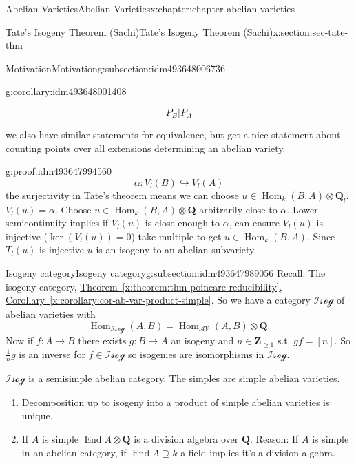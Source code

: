 \documentclass[oneside,10pt,]{book}
\numberwithin{equation}{section}
\newcommand{\lb}{[}
\newcommand{\rb}{]}
\newcommand{\ZZ}{\mathbf{Z}}
\newcommand{\QQ}{\mathbf{Q}}
\newcommand{\cat}[1]{\mathcal{#1}}
\DeclareMathOperator{\End}{End}
\DeclareMathOperator{\Hom}{Hom}
\begin{document}
\begin{chapterptx}{Abelian Varieties}{}{Abelian Varieties}{}{}{x:chapter:chapter-abelian-varieties}
\begin{sectionptx}{Tate's Isogeny Theorem (Sachi)}{}{Tate's Isogeny Theorem (Sachi)}{}{}{x:section:sec-tate-thm}
\begin{subsectionptx}{Motivation}{}{Motivation}{}{}{g:subsection:idm493648006736}
\begin{corollary}{}{}{g:corollary:idm493648001408}
\begin{enumerate}
\begin{enumerate}
\begin{equation*}
P_B | P_A
\end{equation*}
%
\end{enumerate}
%
\end{enumerate}
we also have similar statements for equivalence, but get a nice statement about counting points over all extensions determining an abelian variety.%
\end{corollary}
\begin{proofptx}{}{g:proof:idm493647994560}
%
\begin{equation*}
\alpha \colon V_l(B)\hookrightarrow V_l(A)
\end{equation*}
the surjectivity in Tate's theorem means we can choose \(u \in \Hom_k(B,A) \otimes \QQ_l\). \(V_l(u) = \alpha\). Choose \(u \in \Hom_k(B,A) \otimes \QQ\) arbitrarily close to \(\alpha\). Lower semicontinuity implies if \(V_l(u)\) is close enough to \(\alpha\), can ensure \(V_l(u)\) is injective (\(\ker (V_l (u)) = 0\)) take multiple to get \(u \in \Hom_k(B,A)\). Since \(T_l (u)\) is injective \(u \) is an isogeny to an abelian subvariety.%
\end{proofptx}
\end{subsectionptx}
%
%
\typeout{************************************************}
\typeout{************************************************}
%
\begin{subsectionptx}{Isogeny category}{}{Isogeny category}{}{}{g:subsection:idm493647989056}
Recall: The isogeny category, \hyperref[x:theorem:thm-poincare-reducibility]{Theorem~\ref{x:theorem:thm-poincare-reducibility}}, \hyperref[x:corollary:cor-ab-var-product-simple]{Corollary~\ref{x:corollary:cor-ab-var-product-simple}}. So we have  a category \(\cat{Isog}\) of abelian varieties with%
\begin{equation*}
\Hom_{\cat{Isog}}(A,B) = \Hom_\cat{AV}(A,B)\otimes \QQ\text{.}
\end{equation*}
Now if \(f \colon A \to B\) there exists \(g\colon B \to A\) an isogeny and \(n\in \ZZ_{\ge 1}\) s.t. \(gf = \lb n \rb\). So \(\frac 1n g\) is an inverse for \(f \in \cat{Isog}\) so isogenies are isomorphisms in \(\cat{Isog}\).%
\par
\(\cat{Isog}\) is a semisimple abelian category. The simples are simple abelian varieties.%
\begin{enumerate}
\item{}Decomposition up to isogeny into a product of simple abelian varieties is unique.%
\item{}If \(A\) is simple \(\End A \otimes \QQ\) is a division algebra over \(\QQ\). Reason: If \(A\) is simple in an abelian category, if \(\End A \supseteq k\) a field implies it's a division algebra.%

\end{enumerate}
\end{subsectionptx}
\end{sectionptx}
\end{chapterptx}
\end{document}
